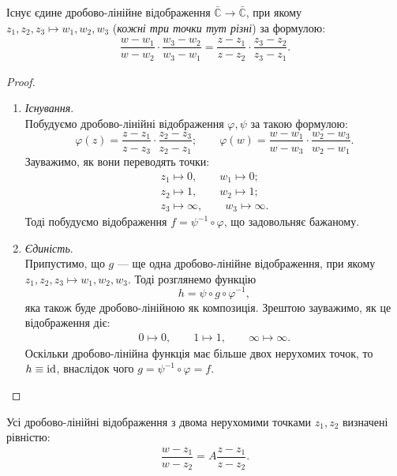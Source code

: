 \documentclass{math_library}
\begin{document}
\begin{theorem}
Існує єдине дробово-лінійне відображення $\bar{\mathbb{C}} \to \bar{\mathbb{C}}$, при якому $z_1,z_2,z_3 \mapsto w_1,w_2,w_3$ (\textit{кожні три точки тут різні}) за формулою:
\begin{align*}
\dfrac{w-w_1}{w-w_2} \cdot \dfrac{w_3-w_2}{w_3-w_1} = \dfrac{z-z_1}{z-z_2} \cdot \dfrac{z_3-z_2}{z_3-z_1}.
\end{align*}
\end{theorem}

\begin{proof}
\begin{enumerate}[topsep=0pt,wide=0pt,label={\Roman*.}]
\item \textit{Існування}.\\
Побудуємо дробово-лінійні відображення $\varphi, \psi$ за такою формулою:
\[
\varphi(z) = \dfrac{z-z_1}{z-z_3} \cdot \dfrac{z_2-z_3}{z_2-z_1}; \qquad \varphi(w) = \dfrac{w-w_1}{w-w_3} \cdot \dfrac{w_2-w_3}{w_2-w_1}.
\]
Зауважимо, як вони переводять точки:
\begin{align*}
z_1 \mapsto 0, \qquad w_1 \mapsto 0; \\
z_2 \mapsto 1, \qquad w_2 \mapsto 1; \\
z_3 \mapsto \infty, \qquad w_3 \mapsto \infty.
\end{align*}
Тоді побудуємо відображення $f = \psi^{-1} \circ \varphi$, що задовольняє бажаному.

\item \textit{Єдиність}.\\
Припустимо, що $g$ --- ще одна дробово-лінійне відображення, при якому $z_1,z_2,z_3 \mapsto w_1,w_2,w_3$. Тоді розглянемо функцію
\[
h = \psi \circ g \circ \varphi^{-1},
\]
яка також буде дробово-лінійною як композиція. Зрештою зауважимо, як це відображення діє:
\begin{align*}
0 \mapsto 0, \qquad 1 \mapsto 1, \qquad \infty \mapsto \infty.
\end{align*}
Оскільки дробово-лінійна функція має більше двох нерухомих точок, то $h \equiv \operatorname{id}$, внаслідок чого $g = \psi^{-1} \circ \varphi = f$. \qedhere
\end{enumerate}
\end{proof}

\begin{corollary}
Усі дробово-лінійні відображення з двома нерухомими точками $z_1,z_2$ визначені рівністю:
\begin{align*}
\dfrac{w-z_1}{w-z_2} = A \dfrac{z-z_1}{z-z_2}.
\end{align*}
\end{corollary}
\end{document}
